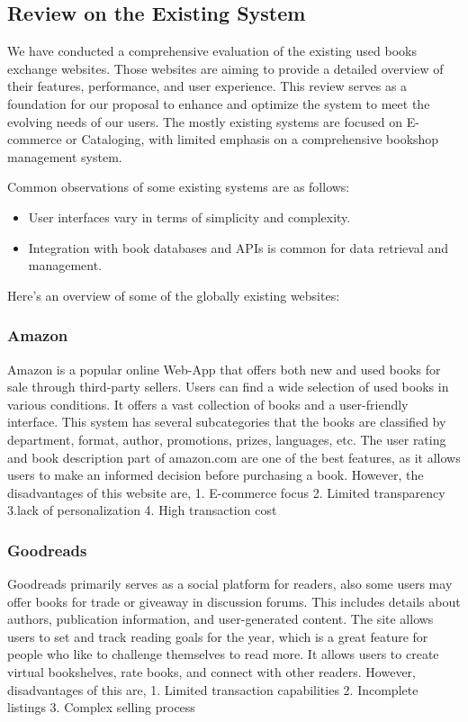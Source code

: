 \newpage
\subsection{Review on the Existing System}
We have conducted a comprehensive evaluation of the existing used books exchange websites. Those websites are aiming to provide a detailed overview of their features, performance, and user experience. This review serves as a foundation for our proposal to enhance and optimize the system to meet the evolving needs of our users. The mostly existing systems are focused on E-commerce or Cataloging, with limited emphasis on a comprehensive bookshop management system.

Common observations of some existing systems are as follows:
\begin{itemize}
    \item User interfaces vary in terms of simplicity and complexity.
    \item Integration with book databases and APIs is common for data retrieval and management.
\end{itemize}

Here's an overview of some of the globally existing websites:

\subsubsection{Amazon}
Amazon is a popular online Web-App that offers both new and used books for sale through third-party sellers. Users can find a wide selection of used books in various conditions. It offers a vast collection of books and a user-friendly interface. This system has several subcategories that the books are classified by department, format, author, promotions, prizes, languages, etc. The user rating and book description part of amazon.com are one of the best features, as it allows users to make an informed decision before purchasing a book. 
However, the disadvantages of this website are,
1. E-commerce focus
2. Limited transparency
3.lack of personalization
4. High transaction cost

\subsubsection{Goodreads}
Goodreads primarily serves as a social platform for readers, also some users may offer books for trade or giveaway in discussion forums. This includes details about authors, publication information, and user-generated content. The site allows users to set and track reading goals for the year, which is a great feature for people who like to challenge themselves to read more. It allows users to create virtual bookshelves, rate books, and connect with other readers. However, disadvantages of this are,
1. Limited transaction capabilities
2. Incomplete listings
3. Complex selling process

